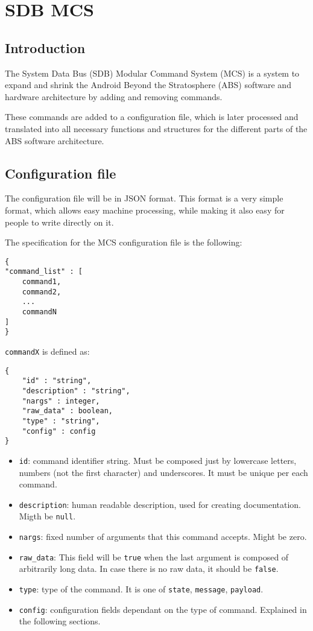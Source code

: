 \documentclass[12pt,a4paper]{report}
\begin{document}
\section*{SDB MCS}

\subsection*{Introduction}
The System Data Bus (SDB) Modular Command System (MCS) is a system to expand and shrink the Android Beyond the Stratosphere (ABS) software and hardware architecture by adding and removing commands.

These commands are added to a configuration file, which is later processed and translated into all necessary functions and structures for the different parts of the ABS software architecture.

\subsection*{Configuration file}
The configuration file will be in JSON format. This format is a very simple format, which allows easy machine processing, while making it also easy for people to write directly on it.

The specification for the MCS configuration file is the following:

\begin{lstlisting}
{
"command_list" : [
	command1,
	command2,
	...
	commandN
]
}
\end{lstlisting}

\texttt{commandX} is defined as:
\begin{lstlisting}
{
    "id" : "string",
    "description" : "string",
    "nargs" : integer,
    "raw_data" : boolean,
    "type" : "string",
    "config" : config
}
\end{lstlisting}

\begin{itemize}
\item \texttt{id}: command identifier string. Must be composed just by lowercase letters, numbers (not the first character) and underscores. It must be unique per each command.
\item \texttt{description}: human readable description, used for creating documentation. Migth be \texttt{null}.
\item \texttt{nargs}: fixed number of arguments that this command accepts. Might be zero.
\item \texttt{raw\_data}: This field will be \texttt{true} when the last argument is composed of arbitrarily long data. In case there is no raw data, it should be \texttt{false}.
\item \texttt{type}: type of the command. It is one of \texttt{state}, \texttt{message}, \texttt{payload}.
\item \texttt{config}: configuration fields dependant on the type of command. Explained in the following sections.
\end{itemize}
\end{document}
